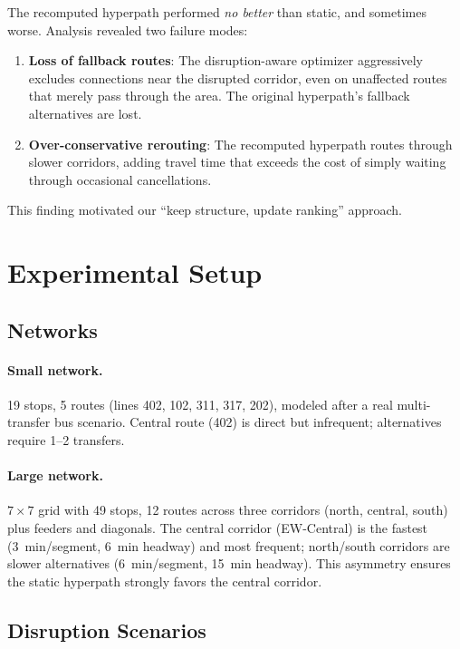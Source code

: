 \documentclass[journal]{IEEEtran}
\begin{document}
The recomputed hyperpath performed \emph{no better} than static, and sometimes worse. Analysis revealed two failure modes:
\begin{enumerate}
    \item \textbf{Loss of fallback routes}: The disruption-aware optimizer aggressively excludes connections near the disrupted corridor, even on unaffected routes that merely pass through the area. The original hyperpath's fallback alternatives are lost.
    \item \textbf{Over-conservative rerouting}: The recomputed hyperpath routes through slower corridors, adding travel time that exceeds the cost of simply waiting through occasional cancellations.
\end{enumerate}

This finding motivated our ``keep structure, update ranking'' approach.

\section{Experimental Setup}
\label{sec:setup}

\subsection{Networks}

\paragraph{Small network.} 19 stops, 5 routes (lines 402, 102, 311, 317, 202), modeled after a real multi-transfer bus scenario. Central route (402) is direct but infrequent; alternatives require 1--2 transfers.

\paragraph{Large network.} $7 \times 7$ grid with 49 stops, 12 routes across three corridors (north, central, south) plus feeders and diagonals. The central corridor (EW-Central) is the fastest (3~min/segment, 6~min headway) and most frequent; north/south corridors are slower alternatives (6~min/segment, 15~min headway). This asymmetry ensures the static hyperpath strongly favors the central corridor.

\subsection{Disruption Scenarios}
\end{document}
